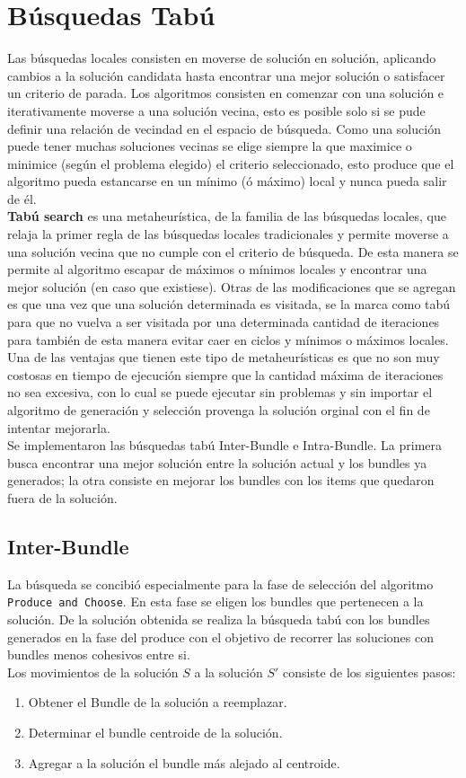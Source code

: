 \section{Búsquedas Tabú}
Las búsquedas locales consisten en moverse de solución en solución, aplicando cambios a la solución candidata hasta encontrar una mejor solución o satisfacer un criterio de parada. Los algoritmos consisten en comenzar con una solución e iterativamente moverse a una solución vecina, esto es posible solo si se pude definir una relación de vecindad en el espacio de búsqueda. Como una solución puede tener muchas soluciones vecinas se elige siempre la que maximice o minimice (según el problema elegido) el criterio seleccionado, esto produce que el algoritmo pueda estancarse en un mínimo (ó máximo) local y nunca pueda salir de él.\\
\textbf{Tabú search} es una metaheurística, de la familia de las búsquedas locales, que relaja la primer regla de las búsquedas locales tradicionales y permite moverse a una solución vecina que no cumple con el criterio de búsqueda. De esta manera se permite al algoritmo escapar de máximos o mínimos locales y encontrar una mejor solución (en caso que existiese). Otras de las modificaciones que se agregan es que una vez que una solución determinada es visitada, se la marca como tabú para que no vuelva a ser visitada por una determinada cantidad de iteraciones para también de esta manera evitar caer en ciclos y mínimos o máximos locales.\\
Una de las ventajas que tienen este tipo de metaheurísticas es que no son muy costosas en tiempo de ejecución siempre que la cantidad máxima de iteraciones no sea excesiva, con lo cual se puede ejecutar sin problemas y sin importar el algoritmo de generación y selección provenga la solución orginal con el fin de intentar mejorarla.\\
Se implementaron las búsquedas tabú Inter-Bundle e Intra-Bundle. La primera busca encontrar una mejor solución entre la solución actual y los bundles ya generados; la otra consiste en mejorar los bundles con los items que quedaron fuera de la solución.

\subsection{Inter-Bundle}
La búsqueda se concibió especialmente para la fase de selección del algoritmo \texttt{Produce and Choose}. En esta fase se eligen los bundles que pertenecen a la solución. De la solución obtenida se realiza la búsqueda tabú con los bundles generados en la fase del produce con el objetivo de recorrer las soluciones con bundles menos cohesivos entre si.\\
Los movimientos de la solución $S$ a la solución $S'$ consiste de los siguientes  pasos:
\begin{enumerate}
	\item Obtener el Bundle de la solución a reemplazar.
	\item Determinar el bundle centroide de la solución.
	\item Agregar a la solución el bundle más alejado al centroide.
\end{enumerate}

